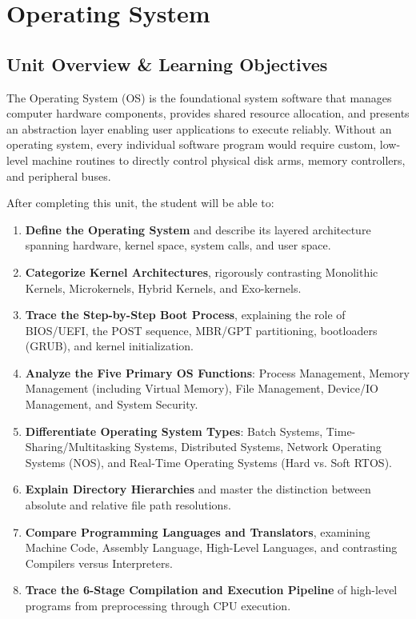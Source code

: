 \chapter{Operating System}
\label{chap:operating-system}

\section{Unit Overview \& Learning Objectives}

The Operating System (OS) is the foundational system software that manages computer hardware components, provides shared resource allocation, and presents an abstraction layer enabling user applications to execute reliably. Without an operating system, every individual software program would require custom, low-level machine routines to directly control physical disk arms, memory controllers, and peripheral buses.

\begin{important}
After completing this unit, the student will be able to:
\begin{enumerate}[leftmargin=1.5em]
    \item \textbf{Define the Operating System} and describe its layered architecture spanning hardware, kernel space, system calls, and user space.
    \item \textbf{Categorize Kernel Architectures}, rigorously contrasting Monolithic Kernels, Microkernels, Hybrid Kernels, and Exo-kernels.
    \item \textbf{Trace the Step-by-Step Boot Process}, explaining the role of BIOS/UEFI, the POST sequence, MBR/GPT partitioning, bootloaders (GRUB), and kernel initialization.
    \item \textbf{Analyze the Five Primary OS Functions}: Process Management, Memory Management (including Virtual Memory), File Management, Device/IO Management, and System Security.
    \item \textbf{Differentiate Operating System Types}: Batch Systems, Time-Sharing/Multitasking Systems, Distributed Systems, Network Operating Systems (NOS), and Real-Time Operating Systems (Hard vs. Soft RTOS).
    \item \textbf{Explain Directory Hierarchies} and master the distinction between absolute and relative file path resolutions.
    \item \textbf{Compare Programming Languages and Translators}, examining Machine Code, Assembly Language, High-Level Languages, and contrasting Compilers versus Interpreters.
    \item \textbf{Trace the 6-Stage Compilation and Execution Pipeline} of high-level programs from preprocessing through CPU execution.
\end{enumerate}
\end{important}

